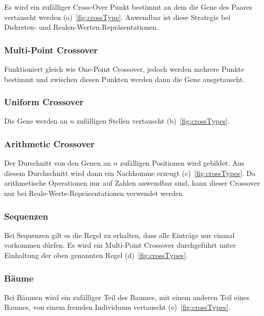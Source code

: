         Es wird ein zufälliger Cross-Over Punkt bestimmt an dem die Gene des Paares vertauscht werden (a)~\vref{fig:crossType}.
        Anwendbar ist diese Strategie bei Diskreten- und Realen-Werten-Repräsentationen.

      \subsubsection{Multi-Point Crossover}

        Funktioniert gleich wie One-Point Crossover, jedoch werden mehrere Punkte bestimmt und
        zwischen diesen Punkten werden dann die Gene ausgetauscht.

      \subsubsection{Uniform Crossover}

        Die Gene werden an \(n\) zufälligen Stellen vertauscht (b)~\vref{fig:crossTypes}.

      \subsubsection{Arithmetic Crossover}

        Der Durschnitt von den Genen an \(n\) zufälligen Positionen wird gebildet.
        Aus diesem Durchschnitt wird dann ein Nachkomme erzeugt (c)~\vref{fig:crossTypes}.
        Da arithmetische Operationen nur auf Zahlen anwendbar sind,
        kann dieser Crossover nur bei Reale-Werte-Repräsentationen verwendet werden.

      \subsubsection{Sequenzen}

        Bei Sequenzen gilt es die Regel zu erhalten, dass alle Einträge nur einmal vorkommen dürfen.
        Es wird ein Multi-Point Crossover durchgeführt unter Einhaltung der oben genannten Regel (d)~\vref{fig:crossTypes}.

      \subsubsection{Bäume}

        Bei Bäumen wird ein zufälliger Teil des Baumes, mit einem anderen Teil eines Baumes, von einem fremden Individuum vertauscht (e)~\vref{fig:crossTypes}.

